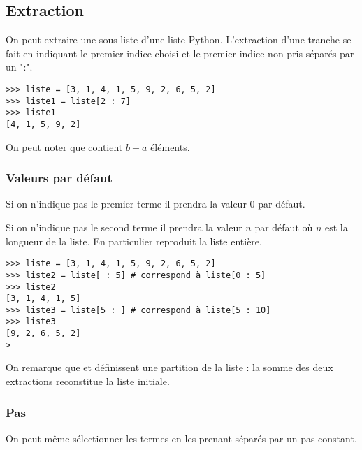 \subsection{Extraction}
On peut extraire une sous-liste d'une liste Python. L'extraction d'une tranche se fait en indiquant le premier indice choisi et le premier indice non pris séparés par un ":".
\begin{lstlisting}
>>> liste = [3, 1, 4, 1, 5, 9, 2, 6, 5, 2]
>>> liste1 = liste[2 : 7]
>>> liste1
[4, 1, 5, 9, 2]
\end{lstlisting}
On peut noter que  contient $b-a$ éléments.
\subsubsection{Valeurs par défaut}
Si on n'indique pas le premier terme il prendra la valeur 0 par défaut.

Si on n'indique pas le second terme il prendra la valeur $n$ par défaut où $n$ est la longueur de la liste.
En particulier  reproduit la liste entière.
\begin{lstlisting}
>>> liste = [3, 1, 4, 1, 5, 9, 2, 6, 5, 2]
>>> liste2 = liste[ : 5] # correspond à liste[0 : 5]
>>> liste2
[3, 1, 4, 1, 5]
>>> liste3 = liste[5 : ] # correspond à liste[5 : 10]
>>> liste3
[9, 2, 6, 5, 2]
>\end{lstlisting}
On remarque que  et  définissent une partition de la liste : la somme des deux extractions reconstitue la liste initiale.
\subsubsection{Pas}
On peut même sélectionner les termes en les prenant séparés par un pas constant. 

